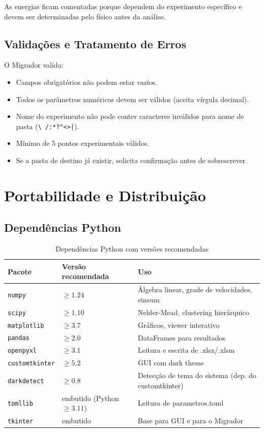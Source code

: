 \documentclass[12pt,a4paper]{report}
\newcommand{\code}[1]{\texttt{#1}}
\begin{document}
As energias ficam comentadas porque dependem do experimento específico
e devem ser determinadas pelo físico antes da análise.

\section{Validações e Tratamento de Erros}

O Migrador valida:
\begin{itemize}
  \item Campos obrigatórios não podem estar vazios.
  \item Todos os parâmetros numéricos devem ser válidos (aceita vírgula decimal).
  \item Nome do experimento não pode conter caracteres inválidos para nome de pasta
    (\texttt{\textbackslash~/:*?"<>|}).
  \item Mínimo de 5 pontos experimentais válidos.
  \item Se a pasta de destino já existir, solicita confirmação antes de sobrescrever.
\end{itemize}


\chapter{Portabilidade e Distribuição}
\label{cap:distribuicao}

\section{Dependências Python}

\begin{table}[h!]
  \centering
  \caption{Dependências Python com versões recomendadas}
  \begin{tabular}{llp{6cm}}
    \toprule
    \textbf{Pacote} & \textbf{Versão recomendada} & \textbf{Uso} \\
    \midrule
    \code{numpy}         & $\geq 1.24$ & Álgebra linear, grade de velocidades, einsum \\
    \code{scipy}         & $\geq 1.10$ & Nelder-Mead, clustering hierárquico \\
    \code{matplotlib}    & $\geq 3.7$  & Gráficos, viewer interativo \\
    \code{pandas}        & $\geq 2.0$  & DataFrames para resultados \\
    \code{openpyxl}      & $\geq 3.1$  & Leitura e escrita de .xlsx/.xlsm \\
    \code{customtkinter} & $\geq 5.2$  & GUI com dark theme \\
    \code{darkdetect}    & $\geq 0.8$  & Detecção de tema do sistema (dep. do customtkinter) \\
    \code{tomllib}       & embutido (Python $\geq 3.11$) & Leitura de parametros.toml \\
    \code{tkinter}       & embutido    & Base para GUI e para o Migrador \\
    \bottomrule
  \end{tabular}
\end{table}
\end{document}
